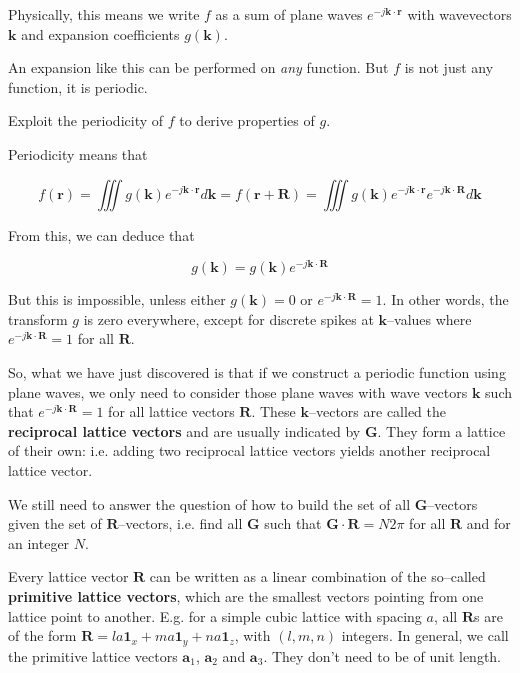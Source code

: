 Physically, this means we write $f$ as a sum of plane waves $e ^ {-j {\mathbf k} \cdot {\mathbf r}}$ with wavevectors ${\mathbf k}$ and expansion coefficients $g({\mathbf k})$.

An expansion like this can be performed on \emph{any} function. But $f$ is not just any function, it is periodic.

\begin{cue}
  Exploit the periodicity of $f$ to derive properties of $g$. 
\end{cue}

Periodicity means that

\begin{equation}
f({\mathbf r}) = \iiint g({\mathbf k}) e ^ {-j {\mathbf k} \cdot {\mathbf r}} d{\mathbf k} = f({\mathbf r} + {\mathbf R}) = \iiint g({\mathbf k}) e ^ {-j {\mathbf k} \cdot {\mathbf r}} e ^ {-j {\mathbf k} \cdot {\mathbf R}} d{\mathbf k}
\end{equation} 

From this, we can deduce that

\begin{equation}
g({\mathbf k}) = g({\mathbf k}) e ^ {-j {\mathbf k} \cdot {\mathbf R}}
\end{equation} 

But this is impossible, unless either $g({\mathbf k}) = 0$ or $e ^ {-j {\mathbf k} \cdot {\mathbf R}} = 1$. In other words, the transform $g$ is zero everywhere, except for discrete spikes at ${\mathbf k}$--values where $e ^ {-j {\mathbf k} \cdot {\mathbf R}} = 1$ for all ${\mathbf R}$.

So, what we have just discovered is that if we construct a periodic function using plane waves, we only need to consider those plane waves with wave vectors ${\mathbf k}$ such that $e ^ {-j {\mathbf k} \cdot {\mathbf R}} = 1$ for all lattice vectors ${\mathbf R}$. These ${\mathbf k}$--vectors are called the \textbf{reciprocal lattice vectors} and are usually indicated by ${\mathbf G}$. They form a lattice of their own: i.e. adding two reciprocal lattice vectors yields another reciprocal lattice vector.

We still need to answer the question of how to build the set of all ${\mathbf G}$--vectors given the set of ${\mathbf R}$--vectors, i.e. find all ${\mathbf G}$ such that ${\mathbf G} \cdot {\mathbf R} = N 2 \pi$ for all ${\mathbf R}$ and for an integer $N$.

Every lattice vector ${\mathbf R}$ can be written as a linear combination of the so--called \textbf{primitive lattice vectors}, which are the smallest vectors pointing from one lattice point to another. E.g. for a simple cubic lattice with spacing $a$, all ${\mathbf R}$s are of the form ${\mathbf R} = la {\mathbf 1}_x + ma {\mathbf 1}_y + na {\mathbf 1}_z$, with $(l,m,n)$ integers. In general, we call the primitive lattice vectors ${\mathbf a}_1$, ${\mathbf a}_2$ and ${\mathbf a}_3$. They don't need to be of unit length.

